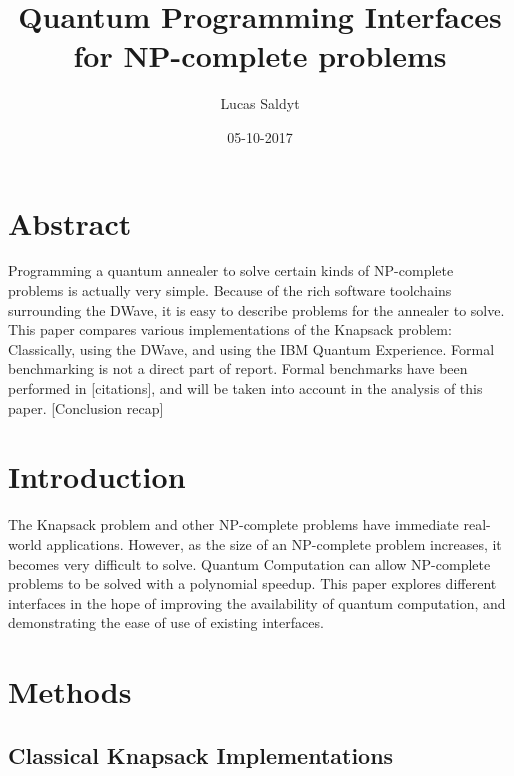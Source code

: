\documentclass{article}
\title{Quantum Programming Interfaces for NP-complete problems}
\date{05-10-2017}
\author{Lucas Saldyt}
\begin{document}
\maketitle
{}
\newpage
\tableofcontents
\newpage
{}

\section{Abstract}

Programming a quantum annealer to solve certain kinds of NP-complete problems is actually very simple.
Because of the rich software toolchains surrounding the DWave, it is easy to describe problems for the annealer to solve.
This paper compares various implementations of the Knapsack problem: Classically, using the DWave, and using the IBM Quantum Experience.
Formal benchmarking is not a direct part of report. Formal benchmarks have been performed in [citations], and will be taken into account in the analysis of this paper.
[Conclusion recap]

\section{Introduction}

The Knapsack problem and other NP-complete problems have immediate real-world applications. 
However, as the size of an NP-complete problem increases, it becomes very difficult to solve.
Quantum Computation can allow NP-complete problems to be solved with a polynomial speedup.
This paper explores different interfaces in the hope of improving the availability of quantum computation, and demonstrating the ease of use of existing interfaces.

\newpage

\section{Methods}

\subsection{Classical Knapsack Implementations}
\end{document}

